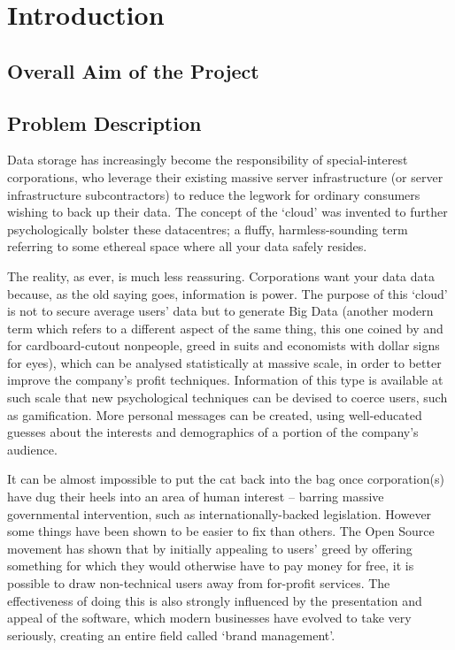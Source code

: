 \documentclass[12pt,a4paper,]{book}
\author{}
\date{}
\begin{document}
\section{Introduction}\label{introduction}

\subsection{Overall Aim of the
Project}\label{overall-aim-of-the-project}

\subsection{Problem Description}\label{problem-description}

Data storage has increasingly become the responsibility of
special-interest corporations, who leverage their existing massive
server infrastructure (or server infrastructure subcontractors) to
reduce the legwork for ordinary consumers wishing to back up their data.
The concept of the `cloud' was invented to further psychologically
bolster these datacentres; a fluffy, harmless-sounding term referring to
some ethereal space where all your data safely resides.

The reality, as ever, is much less reassuring. Corporations want your
data data because, as the old saying goes, information is power. The
purpose of this `cloud' is not to secure average users' data but to
generate Big Data (another modern term which refers to a different
aspect of the same thing, this one coined by and for cardboard-cutout
nonpeople, greed in suits and economists with dollar signs for eyes),
which can be analysed statistically at massive scale, in order to better
improve the company's profit techniques. Information of this type is
available at such scale that new psychological techniques can be devised
to coerce users, such as gamification. More personal messages can be
created, using well-educated guesses about the interests and
demographics of a portion of the company's audience.

It can be almost impossible to put the cat back into the bag once
corporation(s) have dug their heels into an area of human interest --
barring massive governmental intervention, such as
internationally-backed legislation. However some things have been shown
to be easier to fix than others. The Open Source movement has shown that
by initially appealing to users' greed by offering something for which
they would otherwise have to pay money for free, it is possible to draw
non-technical users away from for-profit services. The effectiveness of
doing this is also strongly influenced by the presentation and appeal of
the software, which modern businesses have evolved to take very
seriously, creating an entire field called `brand management'.
\end{document}
